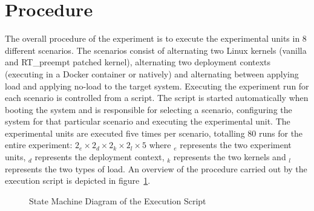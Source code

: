 \section{Procedure}%
The overall procedure of the experiment is to execute the experimental units in 8 different scenarios. The scenarios consist of alternating two Linux kernels (vanilla and RT\_preempt patched kernel), alternating two deployment contexts (executing in a Docker container or natively) and alternating between applying load and applying no-load to the target system. Executing the experiment run for each scenario is controlled from a  script. The script is started automatically when booting the system and is responsible for selecting a scenario, configuring the system for that particular scenario and executing the experimental unit. The experimental units are executed five times per scenario, totalling 80 runs for the entire experiment: \(2_{e} \times 2_{d} \times{} 2_{k}  \times{} 2_{l} \times{} 5 \) where $_{e}$ represents the two experiment units, $_{d}$ represents the deployment context, $_{k}$ represents the two kernels and $_{l}$ represents the two types of load. An overview of the procedure carried out by the execution script is depicted in figure~\ref{procedure-state}.


\begin{figure}[ht]
\caption{State Machine Diagram of the Execution Script }
\label{procedure-state}
\centering
\end{figure}

	

